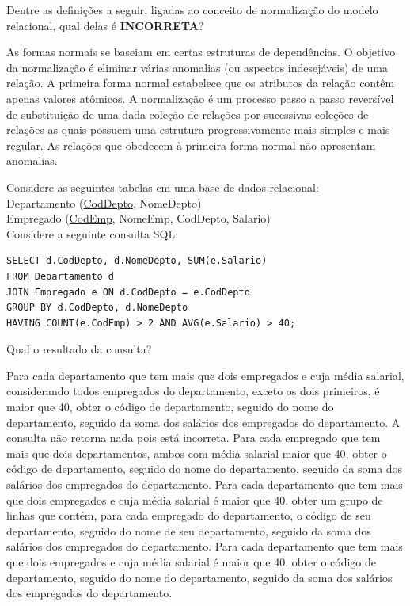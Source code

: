 \documentclass[12pt, addpoints]{exam}
\begin{document}
    \begin{questions}

    \newpage
    \question
Dentre as definições a seguir, ligadas ao conceito de normalização do modelo relacional, qual delas é \textbf{INCORRETA}?

\begin{choices}
\choice As formas normais se baseiam em certas estruturas de dependências.
\choice O objetivo da normalização é eliminar várias anomalias (ou aspectos indesejáveis) de uma relação.
\choice A primeira forma normal estabelece que os atributos da relação contêm apenas valores atômicos.
\choice A normalização é um processo passo a passo reversível de substituição de uma dada coleção de relações por sucessivas coleções de relações as quais possuem uma estrutura progressivamente mais simples e mais regular.
\choice As relações que obedecem à primeira forma normal não apresentam anomalias.
\end{choices}

\question
Considere as seguintes tabelas em uma base de dados relacional:\\
Departamento (\underline{CodDepto}, NomeDepto)\\
Empregado (\underline{CodEmp}, NomeEmp, CodDepto, Salario)\\
Considere a seguinte consulta SQL:
\begin{verbatim}
SELECT d.CodDepto, d.NomeDepto, SUM(e.Salario)
FROM Departamento d
JOIN Empregado e ON d.CodDepto = e.CodDepto
GROUP BY d.CodDepto, d.NomeDepto
HAVING COUNT(e.CodEmp) > 2 AND AVG(e.Salario) > 40;
\end{verbatim}

Qual o resultado da consulta?
\begin{choices}
\choice Para cada departamento que tem mais que dois empregados e cuja média salarial, considerando todos empregados do departamento, exceto os dois primeiros, é maior que 40, obter o código de departamento, seguido do nome do departamento, seguido da soma dos salários dos empregados do departamento.
\choice A consulta não retorna nada pois está incorreta.
\choice Para cada empregado que tem mais que dois departamentos, ambos com média salarial maior que 40, obter o código de departamento, seguido do nome do departamento, seguido da soma dos salários dos empregados do departamento.
\choice Para cada departamento que tem mais que dois empregados e cuja média salarial é maior que 40, obter um grupo de linhas que contém, para cada empregado do departamento, o código de seu departamento, seguido do nome de seu departamento, seguido da soma dos salários dos empregados do departamento.
\choice Para cada departamento que tem mais que dois empregados e cuja média salarial é maior que 40, obter o código de departamento, seguido do nome do departamento, seguido da soma dos salários dos empregados do departamento.
\end{choices}


\end{questions}
\end{document}
